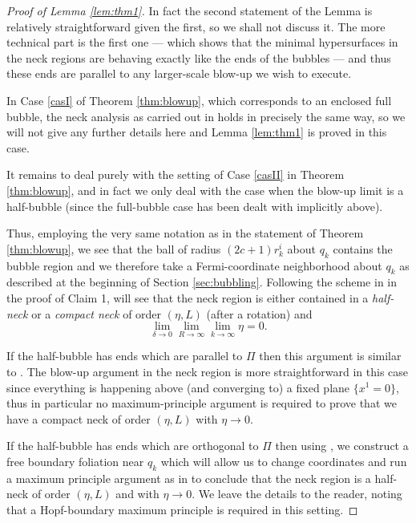 \documentclass[JEP,XML,SOM,Unicode]{cedram}
\newcounter{cas}
\theoremstyle{definition}
\begin{document}
\begin{proof}[Proof of Lemma \ref{lem:thm1}]
In fact the second statement of the Lemma is relatively straightforward given the first, so we shall not discuss it. The more technical part is the first one --- which shows that the minimal hypersurfaces in the neck regions are behaving exactly like the ends of the bubbles --- and thus these ends are parallel to any larger-scale blow-up we wish to execute.

In Case \ref{casI} of Theorem \ref{thm:blowup}, which corresponds to an enclosed full bubble, the neck analysis as carried out in \cite[\S4]{BS17} holds in precisely the same way, so we will not give any further details here and Lemma \ref{lem:thm1} is proved in this case.

It remains to deal purely with the setting of Case \ref{casII} in Theorem \ref{thm:blowup}, and in fact we only deal with the case when the blow-up limit is a half-bubble (since the full-bubble case has been dealt with implicitly above).

Thus, employing the very same notation as in the statement of Theorem \ref{thm:blowup}, we see that the ball of radius $(2c+1)r^i_k$ about $q_k$ contains the bubble region and we therefore take a Fermi-coordinate neighborhood about $q_k$ as described at the beginning of Section \ref{sec:bubbling}. Following the scheme in \cite[p.\,4390]{BS17} in the proof of Claim 1, will see that the neck region is either contained in a \emph{half-neck} or a \emph{compact neck} of order $(\eta, L)$ (after a rotation) and
\[
\lim_{\delta\to 0}\lim_{R\to \infty}\lim_{k\to \infty} \eta = 0.
\]

If the half-bubble has ends which are parallel to $\Pi$ then this argument is similar to \cite[\S4]{BS17}. The blow-up argument in the neck region is more straightforward in this case since everything is happening above (and converging to) a fixed plane $\{x^1 = 0\}$, thus in particular no maximum-principle argument is required to prove that we have a compact neck of order $(\eta, L)$ with $\eta\to 0$.

If the half-bubble has ends which are orthogonal to $\Pi$ then using \cite[\S3]{ACS17}, we construct a free boundary foliation near $q_k$ which will allow us to change coordinates and run a maximum principle argument as in \cite[p.\,4391]{BS17} to conclude that the neck region is a half-neck of order $(\eta ,L)$ and with $\eta \to 0$. We leave the details to the reader, noting that a Hopf-boundary maximum principle is required in this setting.
\end{proof}
\end{document}
